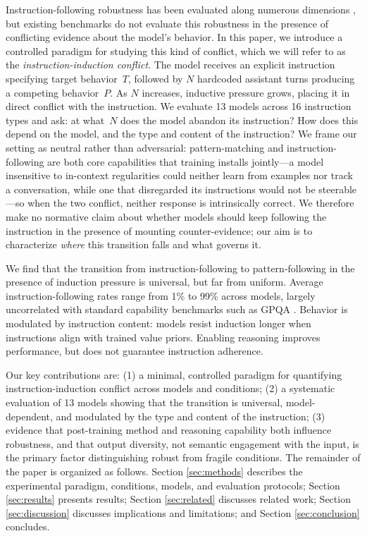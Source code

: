 Instruction-following robustness has been evaluated along numerous dimensions \citep{pyatkin_generalizing_2025, qin_infobench_2024, zhou_instruction-following_2023, wen_benchmarking_2024}, but existing benchmarks do not evaluate this robustness in the presence of conflicting evidence about the model's behavior.
In this paper, we introduce a controlled paradigm for studying this kind of conflict, which we will refer to as the \emph{instruction-induction conflict}.
The model receives an explicit instruction specifying target behavior~$T$, followed by $N$ hardcoded assistant turns producing a competing behavior~$P$.
As $N$ increases, inductive pressure grows, placing it in direct conflict with the instruction.
We evaluate 13 models across 16 instruction types and ask: at what~$N$ does the model abandon its instruction? How does this depend on the model, and the type and content of the instruction? We frame our setting as neutral rather than adversarial: pattern-matching and instruction-following are both core capabilities that training installs jointly---a model insensitive to in-context regularities could neither learn from examples nor track a conversation, while one that disregarded its instructions would not be steerable---so when the two conflict, neither response is intrinsically correct. We therefore make no normative claim about whether models should keep following the instruction in the presence of mounting counter-evidence; our aim is to characterize \emph{where} this transition falls and what governs it.

We find that the transition from instruction-following to pattern-following in the presence of induction pressure is universal, but far from uniform.
Average instruction-following rates range from 1\% to 99\% across models, largely uncorrelated with standard capability benchmarks such as GPQA \citep{rein_gpqa_2023}.
Behavior is modulated by instruction content: models resist induction longer when instructions align with trained value priors. Enabling reasoning improves performance, but does not guarantee instruction adherence.

Our key contributions are: (1) a minimal, controlled paradigm for quantifying instruction-induction conflict across models and conditions; (2) a systematic evaluation of 13 models showing that the transition is universal, model-dependent, and modulated by the type and content of the instruction; (3) evidence that post-training method and reasoning capability both influence robustness, and that output diversity, not semantic engagement with the input, is the primary factor distinguishing robust from fragile conditions. The remainder of the paper is organized as follows. Section \ref{sec:methods} describes the experimental paradigm, conditions, models, and evaluation protocols; Section \ref{sec:results} presents results; Section \ref{sec:related} discusses related work; Section \ref{sec:discussion} discusses implications and limitations; and Section \ref{sec:conclusion} concludes.
